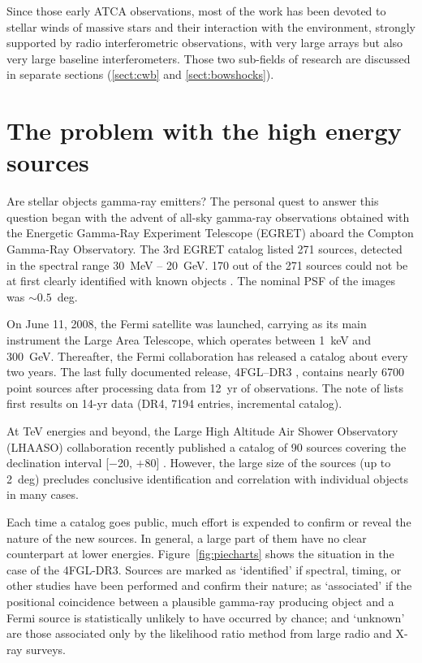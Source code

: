\documentclass[baaa]{baaa}
\begin{document}
Since those early ATCA observations, most of the work has been devoted to stellar winds of massive stars and their interaction with the environment, strongly supported by radio interferometric observations, with very large arrays but also very large baseline interferometers. Those two sub-fields of research are discussed in separate sections (\ref{sect:cwb} and \ref{sect:bowshocks}). 

 
\section{The problem with the high energy sources}\label{sect:HEsources}

Are stellar objects gamma-ray emitters? The personal quest to answer this question began with the advent of all-sky gamma-ray observations obtained with the Energetic Gamma-Ray Experiment Telescope (EGRET) aboard the Compton Gamma-Ray Observatory. The 3rd EGRET catalog listed 271 sources, detected in the spectral range 30~MeV -- 20~GeV.
170 out of the 271 sources could not be at first clearly identified with known objects \citep{hartman1999}. The nominal PSF of the images was $\sim 0.5$~deg.

On June 11, 2008, the Fermi satellite was launched, carrying as its main instrument the Large Area Telescope, which operates between 1~keV and 300~GeV. Thereafter, the Fermi collaboration has released a catalog about every two years. The last fully documented release, 4FGL--DR3 \citep[4th Fermi catalog 3rd data release,][]{abdollahi2022}, contains nearly 6700 point sources after processing data from 12~yr of observations. The note of \citet{ballet2023} lists first results on 14-yr data (DR4, 7194 entries, incremental catalog). 

At TeV energies and beyond, the Large High Altitude Air Shower Observatory (LHAASO) collaboration recently published a catalog of 90 sources covering the declination interval [$-$20, $+80$] \citep{lhaasocat2023}. However, the large size of the sources (up to 2~deg) precludes  conclusive identification and correlation with individual objects in many cases. 

Each time a catalog goes public, much effort is expended to confirm or reveal the nature of the new sources. In general, a large part of them have no clear counterpart at lower energies. 
Figure~\ref{fig:piecharts} shows the situation in the case of the 4FGL-DR3. Sources are marked as `identified' if spectral, timing, or other studies have been performed and confirm their nature; as `associated' if the positional coincidence between a plausible gamma-ray producing object and a Fermi source is statistically unlikely to have occurred by chance; and `unknown' are those associated only by the likelihood ratio method from large radio and X-ray surveys. 
\end{document}
